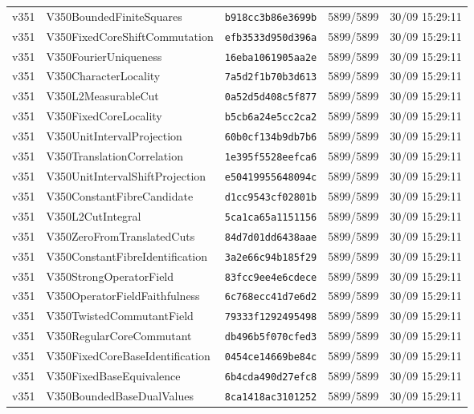 \documentclass[11pt]{article}
\theoremstyle{definition}\newtheorem{deriv}{Derivação}
\begin{document}
{\begin{longtable}{@{}lllll@{}}
v351 & V350BoundedFiniteSquares & \texttt{b918cc3b86e3699b} & 5899/5899 & 30/09 15:29:11 \\
v351 & V350FixedCoreShiftCommutation & \texttt{efb3533d950d396a} & 5899/5899 & 30/09 15:29:11 \\
v351 & V350FourierUniqueness & \texttt{16eba1061905aa2e} & 5899/5899 & 30/09 15:29:11 \\
v351 & V350CharacterLocality & \texttt{7a5d2f1b70b3d613} & 5899/5899 & 30/09 15:29:11 \\
v351 & V350L2MeasurableCut & \texttt{0a52d5d408c5f877} & 5899/5899 & 30/09 15:29:11 \\
v351 & V350FixedCoreLocality & \texttt{b5cb6a24e5cc2ca2} & 5899/5899 & 30/09 15:29:11 \\
v351 & V350UnitIntervalProjection & \texttt{60b0cf134b9db7b6} & 5899/5899 & 30/09 15:29:11 \\
v351 & V350TranslationCorrelation & \texttt{1e395f5528eefca6} & 5899/5899 & 30/09 15:29:11 \\
v351 & V350UnitIntervalShiftProjection & \texttt{e50419955648094c} & 5899/5899 & 30/09 15:29:11 \\
v351 & V350ConstantFibreCandidate & \texttt{d1cc9543cf02801b} & 5899/5899 & 30/09 15:29:11 \\
v351 & V350L2CutIntegral & \texttt{5ca1ca65a1151156} & 5899/5899 & 30/09 15:29:11 \\
v351 & V350ZeroFromTranslatedCuts & \texttt{84d7d01dd6438aae} & 5899/5899 & 30/09 15:29:11 \\
v351 & V350ConstantFibreIdentification & \texttt{3a2e66c94b185f29} & 5899/5899 & 30/09 15:29:11 \\
v351 & V350StrongOperatorField & \texttt{83fcc9ee4e6cdece} & 5899/5899 & 30/09 15:29:11 \\
v351 & V350OperatorFieldFaithfulness & \texttt{6c768ecc41d7e6d2} & 5899/5899 & 30/09 15:29:11 \\
v351 & V350TwistedCommutantField & \texttt{79333f1292495498} & 5899/5899 & 30/09 15:29:11 \\
v351 & V350RegularCoreCommutant & \texttt{db496b5f070cfed3} & 5899/5899 & 30/09 15:29:11 \\
v351 & V350FixedCoreBaseIdentification & \texttt{0454ce14669be84c} & 5899/5899 & 30/09 15:29:11 \\
v351 & V350FixedBaseEquivalence & \texttt{6b4cda490d27efc8} & 5899/5899 & 30/09 15:29:11 \\
v351 & V350BoundedBaseDualValues & \texttt{8ca1418ac3101252} & 5899/5899 & 30/09 15:29:11 \\

\end{longtable}}
\end{document}
